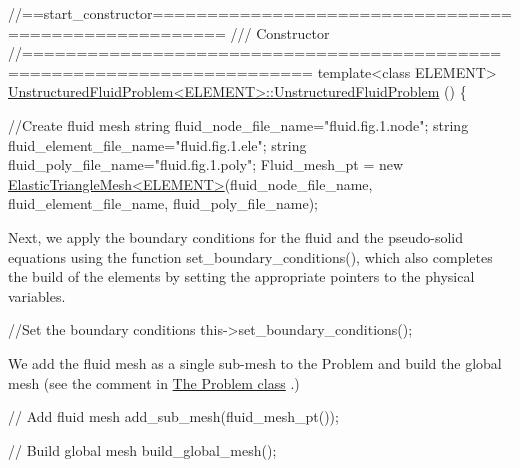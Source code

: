 \begin{DoxyCodeInclude}
\textcolor{comment}{//==start\_constructor=====================================================}
\textcolor{comment}{/// Constructor }
\textcolor{comment}{}\textcolor{comment}{//========================================================================}
\textcolor{keyword}{template}<\textcolor{keyword}{class} ELEMENT>
\hyperlink{classUnstructuredFluidProblem_a9751f4afac540e148b3d90ae43dd5187}{UnstructuredFluidProblem<ELEMENT>::UnstructuredFluidProblem}
      ()
\{ 
 
 \textcolor{comment}{//Create fluid mesh}
 \textcolor{keywordtype}{string} fluid\_node\_file\_name=\textcolor{stringliteral}{"fluid.fig.1.node"};
 \textcolor{keywordtype}{string} fluid\_element\_file\_name=\textcolor{stringliteral}{"fluid.fig.1.ele"};
 \textcolor{keywordtype}{string} fluid\_poly\_file\_name=\textcolor{stringliteral}{"fluid.fig.1.poly"}; 
 Fluid\_mesh\_pt = \textcolor{keyword}{new} \hyperlink{classElasticTriangleMesh}{ElasticTriangleMesh<ELEMENT>}(fluid\_node\_file\_name,
                                                  fluid\_element\_file\_name,
                                                  fluid\_poly\_file\_name);

\end{DoxyCodeInclude}


Next, we apply the boundary conditions for the fluid and the pseudo-\/solid equations using the function {\ttfamily set\+\_\+boundary\+\_\+conditions()}, which also completes the build of the elements by setting the appropriate pointers to the physical variables.


\begin{DoxyCodeInclude}

 \textcolor{comment}{//Set the boundary conditions}
 this->set\_boundary\_conditions();

\end{DoxyCodeInclude}


We add the fluid mesh as a single sub-\/mesh to the {\ttfamily Problem} and build the global mesh (see the comment in \hyperlink{index_class}{The Problem class} .)


\begin{DoxyCodeInclude}
 
 \textcolor{comment}{// Add fluid mesh}
 add\_sub\_mesh(fluid\_mesh\_pt());
 
 \textcolor{comment}{// Build global mesh}
 build\_global\_mesh();

\end{DoxyCodeInclude}


